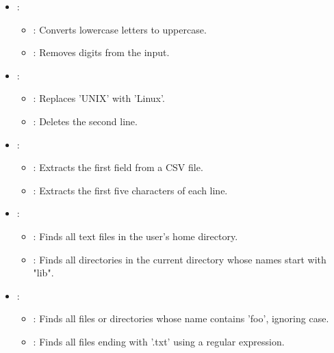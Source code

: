 \begin{exampleblock}
    
    \begin{itemize}
        \item {}:
        \begin{itemize}[label=*]
            \item {}: Converts lowercase letters to uppercase.
            \item {}: Removes digits from the input.
        \end{itemize}
        \item {}:
        \begin{itemize}[label=*]
            \item {}: Replaces 'UNIX' with 'Linux'.
            \item {}: Deletes the second line.
        \end{itemize}
        \item {}:
        \begin{itemize}[label=*]
            \item {}: Extracts the first field from a CSV file.
            \item {}: Extracts the first five characters of each line.
        \end{itemize}
        \item {}:
        \begin{itemize}[label=*]
            \item {}: Finds all text files in the user's home directory.
            \item {}: Finds all directories in the current directory whose names start with "lib".
        \end{itemize}
        \item {}:
        \begin{itemize}[label=*]
            \item {}: Finds all files or directories whose name contains 'foo', ignoring case.
            \item {}: Finds all files ending with '.txt' using a regular expression.
        \end{itemize}
    \end{itemize}
    
\end{exampleblock}
    






